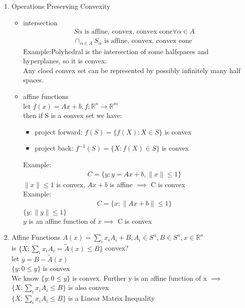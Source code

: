 \documentclass[12pt,letter]{article}
\newcommand{\R}{\mathbb{R}}
\newcommand{\norm}[1]{\|#1\|}
\begin{document}
\begin{enumerate}
\item Operations Preserving Convexity
  \begin{itemize}
  \item intersection
    \begin{align*}
      S{\alpha}\text{ is affine, convex, convex cone} \forall \alpha \in A\\
      \cap_{\alpha \in A} S_{\alpha} \text{ is affine, convex, convex cone}
    \end{align*}
    Example:Polyhedral is the intersection of some halfspaces and hyperplanes, so it is convex.\\
    Any cloed convex set can be represented by possibly infinitely many half spaces.
  \item affine functions\\
    let $f(x)=Ax+b, f:\R^n \to \R^m$\\
    then if S is a convex set we have:
    \begin{itemize}
    \item project forward: $f(S) = \{ f(X) : X \in S \}$ is convex
    \item project back: $f^{-1}(S) = \{ X : f(X) \in S \}$ is convex
    \end{itemize}
    Example:
    \begin{align*}
      C = \{ y : y=Ax+b, \norm{x} \leq 1\}
    \end{align*}
    $\norm{x} \leq 1$ is convex, $Ax+b$ is affine $\implies$ C is convex\\
    Example:
    \begin{align*}
      C = \{ x : \norm{Ax+b} \leq 1 \}
    \end{align*}
    $\{y: \norm{y} \leq 1 \}$\\
    $y$ is an affine function of $x \implies$ C is convex\\
  \end{itemize}
\item Affine Functions
  $A(x)=\sum_i x_i A_i + B, A_i\in S^n, B \in S^n, x\in \R^n$\\
  is $\{X : \sum_i x_i A_i = \tilde{A}(x)\leq B \}$ convex?\\
  let $y = B-\tilde{A}(x)$\\
  $\{y: 0 \leq y \}$ is convex\\
  We know $\{y: 0 \leq y \}$ is convex. Further y is an affine function of x $\implies$\\
  $\{X : \sum_i x_i A_i \leq B \}$ is also convex\\
  $\{X : \sum_i x_i A_i \leq B \}$ is a Linear Matrix Inequality


\end{enumerate}
\end{document}
